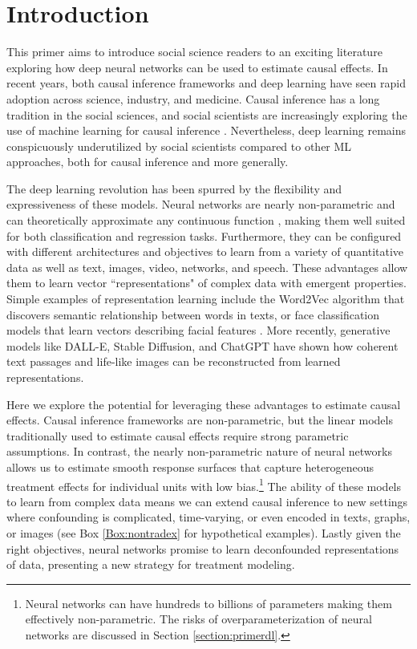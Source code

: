 \section{Introduction}
\label{section:introduction}

This primer aims to introduce social science readers to an exciting literature exploring how deep neural networks can be used to estimate causal effects. In recent years, both causal inference frameworks and deep learning have seen rapid adoption across science, industry, and medicine. Causal inference has a long tradition in the social sciences, and social scientists are increasingly exploring the use of machine learning for causal inference \citep{Athey2016,wager2018, chernozhukov2016double}. Nevertheless, deep learning remains conspicuously underutilized by social scientists compared to other ML approaches, both for causal inference and more generally.

The deep learning revolution has been spurred by the flexibility and expressiveness of these models. Neural networks are nearly non-parametric and can theoretically approximate any continuous function \citep{Cybenko1989ApproximationBS}, making them well suited for both classification and regression tasks. Furthermore, they can be configured with different architectures and objectives to learn from a variety of quantitative data as well as text, images, video, networks, and speech. These advantages allow them to learn vector ``representations" of complex data with emergent properties. Simple examples of representation learning include the Word2Vec algorithm that discovers semantic relationship between words in texts, or face classification models that learn vectors describing facial features \citep{mikolov2013}. More recently, generative models like DALL-E, Stable Diffusion, and ChatGPT have shown how coherent text passages and life-like images can be reconstructed from learned representations. 

Here we explore the potential for leveraging these advantages to estimate causal effects. Causal inference frameworks are non-parametric, but the linear models traditionally used to estimate causal effects require strong parametric assumptions. In contrast, the nearly non-parametric nature of neural networks allows us to estimate smooth response surfaces that capture heterogeneous treatment effects for individual units with low bias.\footnote{Neural networks can have hundreds to billions of parameters making them effectively non-parametric. The risks of overparameterization of neural networks are discussed in Section \ref{section:primerdl}.} The ability of these models to learn from complex data means we can extend causal inference to new settings where confounding is complicated, time-varying, or even encoded in texts, graphs, or images (see Box \ref{Box:nontradex} for hypothetical examples). Lastly given the right objectives, neural networks promise to learn deconfounded representations of data, presenting a new strategy for treatment modeling.

